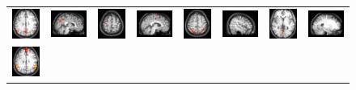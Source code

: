 \documentclass[runningheads, a4paper]{llncs}
\begin{document}
\begin{figure}[!t]
\begin{center}
\begin{tabular}{cccccccc}
      \includegraphics[height=0.10\textwidth]{figures/workshop/ica_separate/DMN_a} &
      \includegraphics[height=0.10\textwidth]{figures/workshop/ica_separate/DMN_s} &
      \vspace{1pt}
      \includegraphics[height=0.10\textwidth]{figures/workshop/ica_separate/motor_a} &
      \includegraphics[height=0.10\textwidth]{figures/workshop/ica_separate/motor_s} &
      \vspace{1pt}
      \includegraphics[height=0.10\textwidth]{figures/workshop/ica_separate/atten_a} &
      \includegraphics[height=0.10\textwidth]{figures/workshop/ica_separate/atten_s} &
      \vspace{1pt}
      \includegraphics[height=0.10\textwidth]{figures/workshop/ica_separate/visual_a} &
      \includegraphics[height=0.10\textwidth]{figures/workshop/ica_separate/visual_s} \\
      \includegraphics[height=0.10\textwidth]{figures/workshop/ica_single/dmn_a} &

\end{tabular}
\end{center}
\end{figure}
\end{document}
